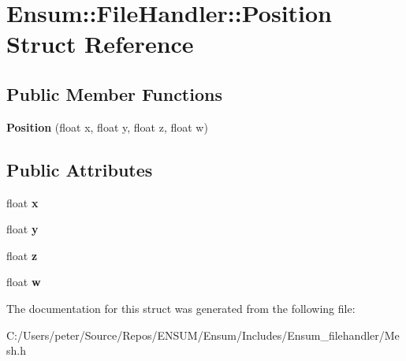 \hypertarget{struct_ensum_1_1_file_handler_1_1_position}{}\section{Ensum\+:\+:File\+Handler\+:\+:Position Struct Reference}
\label{struct_ensum_1_1_file_handler_1_1_position}
\subsection*{Public Member Functions}
\begin{DoxyCompactItemize}
\item 
{\bfseries Position} (float x, float y, float z, float w)\hypertarget{struct_ensum_1_1_file_handler_1_1_position_ae889f82eaa5ea4acb521c77c544067e4}{}\label{struct_ensum_1_1_file_handler_1_1_position_ae889f82eaa5ea4acb521c77c544067e4}

\end{DoxyCompactItemize}
\subsection*{Public Attributes}
\begin{DoxyCompactItemize}
\item 
float {\bfseries x}\hypertarget{struct_ensum_1_1_file_handler_1_1_position_a48dfb28fbf0223b9f7349921a2309f7f}{}\label{struct_ensum_1_1_file_handler_1_1_position_a48dfb28fbf0223b9f7349921a2309f7f}

\item 
float {\bfseries y}\hypertarget{struct_ensum_1_1_file_handler_1_1_position_ae0917114a009fb8c388f9a827a0f11c0}{}\label{struct_ensum_1_1_file_handler_1_1_position_ae0917114a009fb8c388f9a827a0f11c0}

\item 
float {\bfseries z}\hypertarget{struct_ensum_1_1_file_handler_1_1_position_a717ec95f14dca91bd146fca3e8bc9c56}{}\label{struct_ensum_1_1_file_handler_1_1_position_a717ec95f14dca91bd146fca3e8bc9c56}

\item 
float {\bfseries w}\hypertarget{struct_ensum_1_1_file_handler_1_1_position_adcd7ee30a2921e60cec18e41a5efdbd4}{}\label{struct_ensum_1_1_file_handler_1_1_position_adcd7ee30a2921e60cec18e41a5efdbd4}

\end{DoxyCompactItemize}


The documentation for this struct was generated from the following file\+:\begin{DoxyCompactItemize}
\item 
C\+:/\+Users/peter/\+Source/\+Repos/\+E\+N\+S\+U\+M/\+Ensum/\+Includes/\+Ensum\+\_\+filehandler/Mesh.\+h\end{DoxyCompactItemize}
